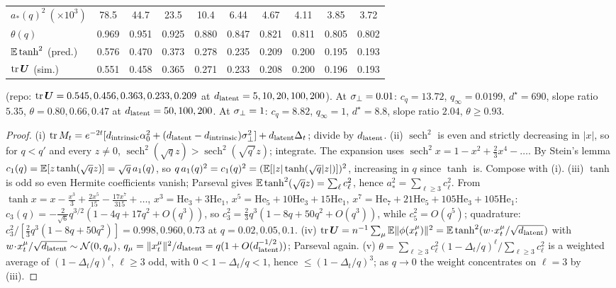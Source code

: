 \begin{lemma}
\begin{center}
\begin{tabular}{lccccccccc}
$a_*(q)^2\ (\times10^3)$ & 78.5 & 44.7 & 23.5 & 10.4 & 6.44 & 4.67 & 4.11 & 3.85 & 3.72\\
$\theta(q)$ & 0.969 & 0.951 & 0.925 & 0.880 & 0.847 & 0.821 & 0.811 & 0.805 & 0.802\\
$\mathbb{E}\tanh^2$ (pred.) & 0.576 & 0.470 & 0.373 & 0.278 & 0.235 & 0.209 & 0.200 & 0.195 & 0.193\\
$\operatorname{tr}\bm{U}$ (sim.) & 0.551 & 0.458 & 0.365 & 0.271 & 0.233 & 0.208 & 0.200 & 0.196 & 0.193
\end{tabular}
\end{center}
(repo: $\operatorname{tr}\bm{U}=0.545,0.456,0.363,0.233,0.209$ at $d_{\mathrm{latent}}=5,10,20,100,200$). At $\sigma_{\perp}=0.01$: $c_q=13.72$, $q_\infty=0.0199$, $d^\star=690$, slope ratio $5.35$, $\theta=0.80,0.66,0.47$ at $d_{\mathrm{latent}}=50,100,200$. At $\sigma_{\perp}=1$: $c_q=8.82$, $q_\infty=1$, $d^\star=8.8$, slope ratio $2.04$, $\theta\ge0.93$.
\end{lemma}
\begin{proof}
(i) $\operatorname{tr}M_t=e^{-2t}[d_{\mathrm{intrinsic}}\alpha_0^2+(d_{\mathrm{latent}}-d_{\mathrm{intrinsic}})\sigma_{\perp}^2]+d_{\mathrm{latent}}\Delta_t$; divide by $d_{\mathrm{latent}}$. (ii) $\operatorname{sech}^2$ is even and strictly decreasing in $|x|$, so for $q<q'$ and every $z\ne0$, $\operatorname{sech}^2(\sqrt qz)>\operatorname{sech}^2(\sqrt{q'}z)$; integrate. The expansion uses $\operatorname{sech}^2x=1-x^2+\tfrac23x^4-\dots$. By Stein's lemma $c_1(q)=\mathbb{E}[z\tanh(\sqrt qz)]=\sqrt q\,a_1(q)$, so $q\,a_1(q)^2=c_1(q)^2=(\mathbb{E}[|z|\tanh(\sqrt q|z|)])^2$, increasing in $q$ since $\tanh$ is. Compose with (i). (iii) $\tanh$ is odd so even Hermite coefficients vanish; Parseval gives $\mathbb{E}\tanh^2(\sqrt qz)=\sum_\ell c_\ell^2$, hence $a_*^2=\sum_{\ell\ge3}c_\ell^2$. From $\tanh x=x-\tfrac{x^3}3+\tfrac{2x^5}{15}-\tfrac{17x^7}{315}+\dots$, $x^3=\mathrm{He}_3+3\mathrm{He}_1$, $x^5=\mathrm{He}_5+10\mathrm{He}_3+15\mathrm{He}_1$, $x^7=\mathrm{He}_7+21\mathrm{He}_5+105\mathrm{He}_3+105\mathrm{He}_1$: $c_3(q)=-\tfrac{2}{\sqrt6}q^{3/2}(1-4q+17q^2+O(q^3))$, so $c_3^2=\tfrac23q^3(1-8q+50q^2+O(q^3))$, while $c_5^2=O(q^5)$; quadrature: $c_3^2/[\tfrac23q^3(1-8q+50q^2)]=0.998,0.960,0.73$ at $q=0.02,0.05,0.1$. (iv) $\operatorname{tr}\bm{U}=n^{-1}\sum_\mu\mathbb{E}\|\phi(x^\mu_t)\|^2=\mathbb{E}\tanh^2(w\!\cdot\!x^\mu_t/\sqrt{d_{\mathrm{latent}}})$ with $w\!\cdot\!x^\mu_t/\sqrt{d_{\mathrm{latent}}}\sim\mathcal N(0,q_\mu)$, $q_\mu=\|x^\mu_t\|^2/d_{\mathrm{latent}}=q(1+O(d_{\mathrm{latent}}^{-1/2}))$; Parseval again. (v) $\theta=\sum_{\ell\ge3}c_\ell^2(1-\Delta_t/q)^\ell/\sum_{\ell\ge3}c_\ell^2$ is a weighted average of $(1-\Delta_t/q)^\ell$, $\ell\ge3$ odd, with $0<1-\Delta_t/q<1$, hence $\le(1-\Delta_t/q)^3$; as $q\to0$ the weight concentrates on $\ell=3$ by (iii).
\end{proof}

